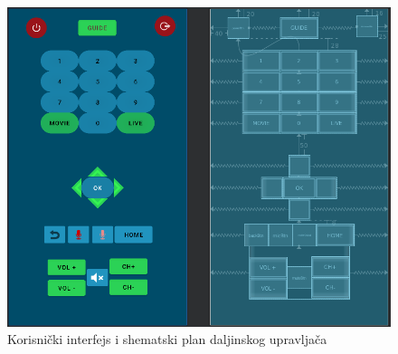 \documentclass[implementacija.tex]{subfiles}
\begin{document}
\begin{figure}[!ht]
  \centering
  \includegraphics[width=\textwidth]{Implementacija/snimci_ekrana/remote_control_scene.png}
  \caption{Korisnički interfejs i shematski plan daljinskog upravljača}
  \label{fig:remoteScena}
\end{figure}
\end{document}
